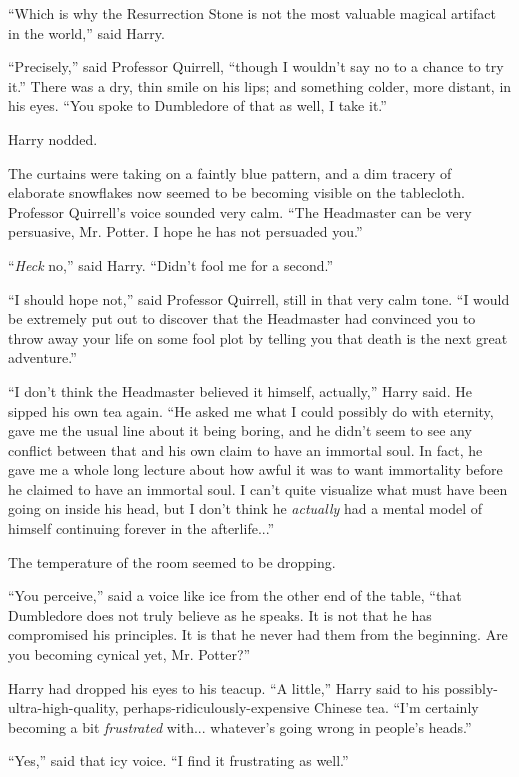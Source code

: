 ``Which is why the Resurrection Stone is not the most valuable magical artifact in the world,'' said Harry.

``Precisely,'' said Professor Quirrell, ``though I wouldn't say no to a chance to try it.'' There was a dry, thin smile on his lips; and something colder, more distant, in his eyes. ``You spoke to Dumbledore of that as well, I take it.''

Harry nodded.

The curtains were taking on a faintly blue pattern, and a dim tracery of elaborate snowflakes now seemed to be becoming visible on the tablecloth. Professor Quirrell's voice sounded very calm. ``The Headmaster can be very persuasive, Mr. Potter. I hope he has not persuaded you.''

``\emph{Heck} no,'' said Harry. ``Didn't fool me for a second.''

``I should hope not,'' said Professor Quirrell, still in that very calm tone. ``I would be extremely put out to discover that the Headmaster had convinced you to throw away your life on some fool plot by telling you that death is the next great adventure.''

``I don't think the Headmaster believed it himself, actually,'' Harry said. He sipped his own tea again. ``He asked me what I could possibly do with eternity, gave me the usual line about it being boring, and he didn't seem to see any conflict between that and his own claim to have an immortal soul. In fact, he gave me a whole long lecture about how awful it was to want immortality before he claimed to have an immortal soul. I can't quite visualize what must have been going on inside his head, but I don't think he \emph{actually} had a mental model of himself continuing forever in the afterlife...''

The temperature of the room seemed to be dropping.

``You perceive,'' said a voice like ice from the other end of the table, ``that Dumbledore does not truly believe as he speaks. It is not that he has compromised his principles. It is that he never had them from the beginning. Are you becoming cynical yet, Mr. Potter?''

Harry had dropped his eyes to his teacup. ``A little,'' Harry said to his possibly-ultra-high-quality, perhaps-ridiculously-expensive Chinese tea. ``I'm certainly becoming a bit \emph{frustrated} with... whatever's going wrong in people's heads.''

``Yes,'' said that icy voice. ``I find it frustrating as well.''

